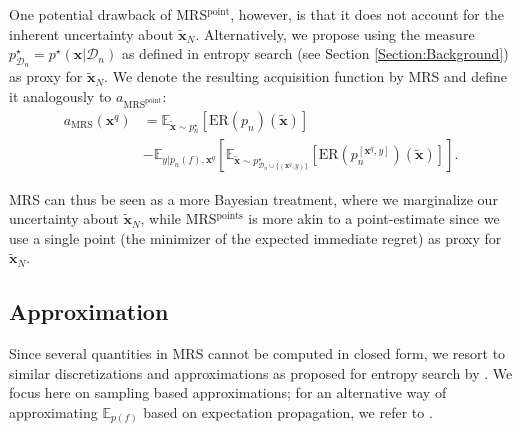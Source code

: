 \documentclass[10pt,letterpaper]{article} %
\begin{document}
One potential drawback of MRS$^{\text{point}}$, however,  is that it does not account for
the inherent uncertainty about $\mathbf{\tilde x}_N$. Alternatively, we propose using
the measure $p^\star_{\mathcal{D}_n} = p^\star(\mathbf{x} \vert \mathcal{D}_n)$ as defined in
entropy search (see Section \ref{Section:Background}) as proxy for $\mathbf{\tilde x}_N$.
We denote the resulting acquisition function by MRS and define it analogously to $a_{\text{MRS}^{\text{point}}}$:
\begin{equation*}
\begin{split}
a_{\text{MRS}}(\mathbf{x}^q)
   & = \mathbb{E}_{\mathbf{\tilde x} \sim p^\star_n}[\text{ER}(p_n)(\mathbf{\tilde x})] \\
      & - \mathbb{E}_{y \vert p_n(f), \mathbf{x}^q}[
          \mathbb{E}_{\mathbf{\tilde x} \sim p^\star_{\mathcal{D}_n \cup \{(\mathbf{x}^q, y)\}}}[
             \text{ER}(p^{[\mathbf{x}^q, y]}_n)(\mathbf{\tilde x})]].
\end{split}
\end{equation*}

MRS can thus be seen as a more Bayesian treatment, where we marginalize our
uncertainty about $\mathbf{\tilde x}_N$, while MRS$^\text{points}$ is more akin
to a point-estimate since we use a single point (the minimizer of the expected immediate regret)
as proxy for $\mathbf{\tilde x}_N$.

\subsection{Approximation}
Since several quantities in MRS cannot be computed in closed form, we
resort to similar discretizations and approximations as proposed for entropy search by \citet{hennig_entropy_2012}. We
focus here on sampling based approximations; for an alternative way of approximating $\mathbb{E}_{p(f)}$ based on
expectation propagation, we refer to \citet{hennig_entropy_2012}.
\end{document}
